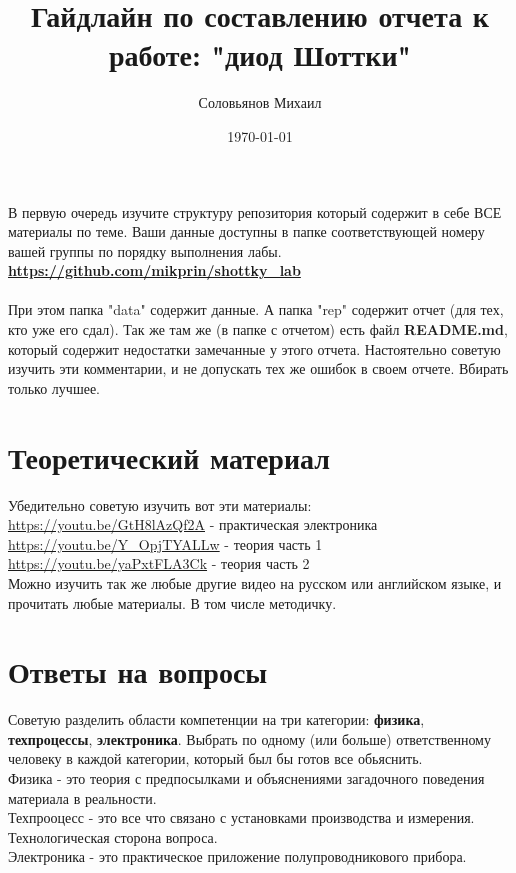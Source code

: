 \documentclass[a4paper,12pt]{article} %
\author{Соловьянов Михаил}
\title{Гайдлайн по составлению отчета к работе: "диод Шоттки"}
\date{\today}
\begin{document}
\maketitle


В первую очередь изучите структуру репозитория который содержит в себе ВСЕ материалы по теме. Ваши данные доступны в папке соответствующей номеру вашей группы по порядку выполнения лабы. \textbf{\url{https://github.com/mikprin/shottky_lab}}
\\
\\
 При этом папка "data" содержит данные. А папка "rep" содержит отчет (для тех, кто уже его сдал). Так же там же (в папке с отчетом) есть файл \textbf{README.md}, который содержит недостатки замечанные у этого отчета. Настоятельно советую изучить эти комментарии, и не допускать тех же ошибок в своем отчете. Вбирать только лучшее.
\section{Теоретический материал}

Убедительно советую изучить вот эти материалы:\\

\url{https://youtu.be/GtH8lAzQf2A}  - практическая электроника\\
\url{https://youtu.be/Y_OpjTYALLw} - теория часть 1\\
\url{https://youtu.be/yaPxtFLA3Ck} - теория часть 2\\

Можно изучить так же любые другие видео на русском или английском языке, и прочитать любые материалы. В том числе методичку.
\section{Ответы на вопросы}
Советую разделить области компетенции на три категории: \textbf{физика}, \textbf{техпроцессы}, \textbf{электроника}. Выбрать по одному (или больше) ответственному человеку в каждой категории, который был бы готов все обьяснить.\\
Физика - это теория с предпосылками и объяснениями загадочного поведения материала в реальности.\\
Техпрооцесс - это все что связано с установками производства и измерения. Технологическая сторона вопроса.\\
Электроника - это практическое приложение полупроводникового прибора.\\
\end{document}
